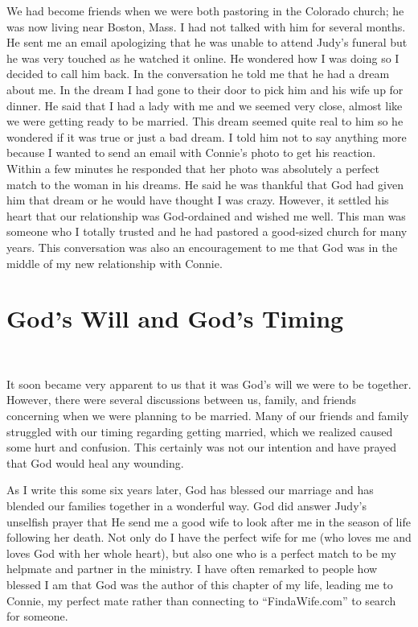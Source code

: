 \documentclass[twoside, 12pt]{book}
\begin{document}
We had become friends when we were both pastoring in the Colorado church; he was now living near Boston, Mass. I had not talked with him for several months. He sent me an email apologizing that he was unable to attend Judy’s funeral but he was very touched as he watched it online. He wondered how I was doing so I decided to call him back. In the conversation he told me that he had a dream about me. In the dream I had gone to their door to pick him and his wife up for dinner. He said that I had a lady with me and we seemed very close, almost like we were getting ready to be married. This dream seemed quite real to him so he wondered if it was true or just a bad dream. I told him not to say anything more because I wanted to send an email with Connie’s photo to get his reaction. Within a few minutes he responded that her photo was absolutely a perfect match to the woman in his dreams. He said he was thankful that God had given him that dream or he would have thought I was crazy. However, it settled his heart that our relationship was God-ordained and wished me well. This man was someone who I totally trusted and he had pastored a good-sized church for many years. This conversation was also an encouragement to me that God was in the middle of my new relationship with Connie.



\section{God's Will and God's Timing}
\

It soon became very apparent to us that it was God’s will we were to be together. However, there were several discussions between us, family, and friends concerning when we were planning to be married. Many of our friends and family struggled with our timing regarding getting married, which we realized caused some hurt and confusion. This certainly was not our intention and have prayed that God would heal any wounding. 

As I write this some six years later, God has blessed our marriage and has blended our families together in a wonderful way. God did answer Judy’s unselfish prayer that He send me a good wife to look after me in the season of life following her death. Not only do I have the perfect wife for me (who loves me and loves God with her whole heart), but also one who is a perfect match to be my helpmate and partner in the ministry. I have often remarked to people how blessed I am that God was the author of this chapter of my life, leading me to Connie, my perfect mate rather than connecting to “FindaWife.com” to search for someone.
\end{document}
